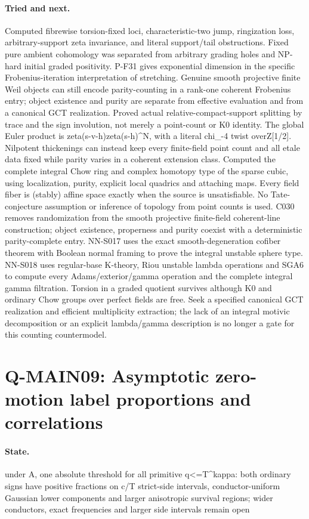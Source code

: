 \paragraph{Tried and next.} Computed fibrewise torsion-fixed loci, characteristic-two jump, ringization loss, arbitrary-support zeta invariance, and literal support/tail obstructions. Fixed pure ambient cohomology was separated from arbitrary grading holes and NP-hard initial graded positivity. P-F31 gives exponential dimension in the specific Frobenius-iteration interpretation of stretching. Genuine smooth projective finite Weil objects can still encode parity-counting in a rank-one coherent Frobenius entry; object existence and purity are separate from effective evaluation and from a canonical GCT realization. Proved actual relative-compact-support splitting by trace and the sign involution, not merely a point-count or K0 identity. The global Euler product is zeta(s-v-h)zeta(s-h)\textasciicircum{}N, with a literal chi\_-4 twist overZ[1/2]. Nilpotent thickenings can instead keep every finite-field point count and all etale data fixed while parity varies in a coherent extension class. Computed the complete integral Chow ring and complex homotopy type of the sparse cubic, using localization, purity, explicit local quadrics and attaching maps. Every field fiber is (stably) affine space exactly when the source is unsatisfiable. No Tate-conjecture assumption or inference of topology from point counts is used. C030 removes randomization from the smooth projective finite-field coherent-line construction; object existence, properness and purity coexist with a deterministic parity-complete entry. NN-S017 uses the exact smooth-degeneration cofiber theorem with Boolean normal framing to prove the integral unstable sphere type. NN-S018 uses regular-base K-theory, Riou unstable lambda operations and SGA6 to compute every Adams/exterior/gamma operation and the complete integral gamma filtration. Torsion in a graded quotient survives although K0 and ordinary Chow groups over perfect fields are free. Seek a specified canonical GCT realization and efficient multiplicity extraction; the lack of an integral motivic decomposition or an explicit lambda/gamma description is no longer a gate for this counting countermodel.

\section{Q-MAIN09: Asymptotic zero-motion label proportions and correlations}
\paragraph{State.} under A, one absolute threshold for all primitive q<=T\textasciicircum{}kappa: both ordinary signs have positive fractions on c/T strict-side intervals, conductor-uniform Gaussian lower components and larger anisotropic survival regions; wider conductors, exact frequencies and larger side intervals remain open
